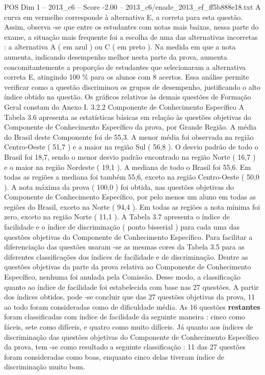 \begin{textsample}{POS Dim 1 – 2013\_c6 – Score -2.00 – 2013\_c6/enade\_2013\_ef\_ff5b888e18.txt}
A curva em vermelho corresponde à alternativa E, a correta para esta questão.
Assim, observa -se que entre os estudantes com notas mais baixas, nessa parte do exame, a situação mais frequente foi a escolha de uma das alternativas incorretas : a alternativa A ( em azul ) ou C ( em preto ).
Na medida em que a nota aumenta, indicando desempenho melhor nesta parte da prova, aumenta concomitantemente a proporção de estudantes que selecionaram a alternativa correta E, atingindo 100 \% para os alunos com 8 acertos.
Essa análise permite verificar como a questão discriminou os grupos de desempenho, justificando o alto índice obtido na questão.
Os gráficos relativos às demais questões de Formação Geral constam do Anexo I. 3.2.2 Componente de Conhecimento Específico A Tabela 3.6 apresenta as estatísticas básicas em relação às questões objetivas do Componente de Conhecimento Específico da prova, por Grande Região.
A média do Brasil deste Componente foi de 55,3.
A menor média foi observada na região Centro-Oeste ( 51,7 ) e a maior na região Sul ( 56,8 ).
O desvio padrão de todo o Brasil foi 18,7, sendo o menor desvio padrão encontrado na região Norte ( 16,7 ) e o maior na região Nordeste ( 19,1 ).
A mediana de todo o Brasil foi 55,6.
Em todas as regiões a mediana foi também 55,6, exceto na região Centro-Oeste ( 50,0 ).
A nota máxima da prova ( 100,0 ) foi obtida, nas questões objetivas do Componente de Conhecimento Específico, por pelo menos um aluno em todas as regiões do Brasil, exceto na Norte ( 94,4 ).
Em todas as regiões a nota mínima foi zero, exceto na região Norte ( 11,1 ).
A Tabela 3.7 apresenta o índice de facilidade e o índice de discriminação ( ponto bisserial ) para cada uma das questões objetivas do Componente de Conhecimento Específico.
Para facilitar a diferenciação das questões usaram -se as mesmas cores da Tabela 3.5 para as diferentes classificações dos índices de facilidade e de discriminação.
Dentre as questões objetivas da parte da prova relativa ao Componente de Conhecimento Específico, nenhuma foi anulada pela Comissão.
Desse modo, a classificação quanto ao índice de facilidade foi estabelecida com base nas 27 questões.
A partir dos índices obtidos, pode -se concluir que das 27 questões objetivas da prova, 11 ao todo foram consideradas como de dificuldade média.
As 16 questões \textbf{restantes} foram classificadas com índice de facilidade da seguinte maneira : cinco como fáceis, sete como difíceis, e quatro como muito difíceis.
Já quanto aos índices de discriminação das questões objetivas do Componente de Conhecimento Específico da prova, tem -se como resultado a seguinte classificação : 11 das 27 questões foram consideradas como boas, enquanto cinco delas tiveram índice de discriminação muito bom.

\end{textsample}
